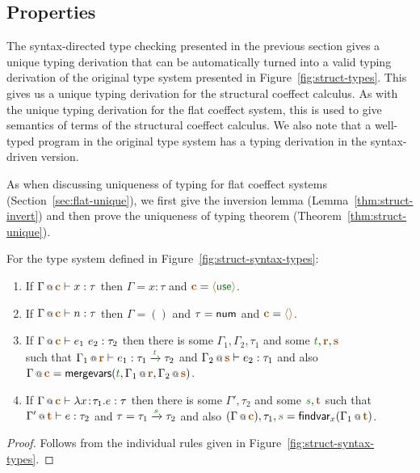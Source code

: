 
\subsection{Properties}

The syntax-directed type checking presented in the previous section gives a unique typing derivation
that can be automatically turned into a valid typing derivation of the original type system
presented in Figure~\ref{fig:struct-types}. This gives us a unique typing derivation for the
structural coeffect calculus. As with the unique typing derivation for the flat coeffect system,
this is used to give semantics of terms of the structural coeffect calculus. We also note that
a well-typed program in the original type system has a typing derivation in the syntax-driven
version.

As when discussing uniqueness of typing for flat coeffect systems (Section~\ref{sec:flat-unique}),
we first give the inversion lemma (Lemma~\ref{thm:struct-invert}) and then prove the
uniqueness of typing theorem (Theorem~\ref{thm:struct-unique}).

\begin{lemma}
\label{thm:struct-invert}
For the type system defined in Figure~\ref{fig:struct-syntax-types}:
%
\begin{enumerate}
\raggedright
\item If $\coctx{\Gamma}{\aclrd{\textbf{c}}} \vdash x : \tau$ then $\Gamma = x\!:\!\tau$ and $\aclrd{\textbf{c}} = \alift{\cunit}$.
\item If $\coctx{\Gamma}{\aclrd{\textbf{c}}} \vdash n : \tau$ then $\Gamma = ()$ and $\tau = \ident{num}$ and $\aclrd{\textbf{c}} = \alift{}$.
\item If $\coctx{\Gamma}{\aclrd{\textbf{c}}} \vdash e_1~e_2 : \tau_2$
  then there is some $\Gamma_1, \Gamma_2, \tau_1$ and some $\cclrd{t}, \aclrd{\textbf{r}}, \aclrd{\textbf{s}}$ \\ such that
  $\coctx{\Gamma_1}{\aclrd{\textbf{r}}} \vdash e_1 : \tau_1 \xrightarrow{\cclrd{t}} \tau_2$ and
  $\coctx{\Gamma_2}{\aclrd{\textbf{s}}} \vdash e_2 : \tau_1$ and also
  $\coctx{\Gamma}{\aclrd{\textbf{c}}} = \ident{mergevars}(\cclrd{t}, \coctx{\Gamma_1}{\aclrd{\textbf{r}}}, \coctx{\Gamma_2}{\aclrd{\textbf{s}}})$.
\item If $\coctx{\Gamma}{\aclrd{\textbf{c}}} \vdash \lambda x\!:\!\tau_1.e : \tau$
  then there is some $\Gamma', \tau_2$ and some $\cclrd{s}, \aclrd{\textbf{t}}$ such that
  $\coctx{\Gamma'}{\aclrd{\textbf{t}}} \vdash e : \tau_2$ and
  $\tau = \tau_1 \xrightarrow{\cclrd{s}} \tau_2$ and also
  $(\coctx{\Gamma}{\aclrd{\textbf{c}}}), \tau_1, \cclrd{s} = \ident{findvar}_x(\coctx{\Gamma_1}{\aclrd{\textbf{t}}})$.
\end{enumerate}
\end{lemma}
\begin{proof}
Follows from the individual rules given in Figure~\ref{fig:struct-syntax-types}.
\end{proof}

